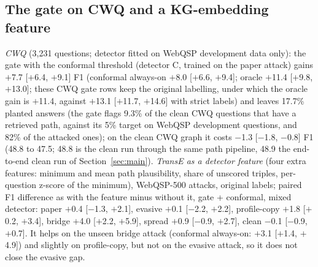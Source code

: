 \documentclass[preprint,12pt]{elsarticle}
\begin{document}
\subsection{The gate on CWQ and a KG-embedding feature}\label{sec:cwqkge}
\emph{CWQ} (3{,}231 questions; detector fitted on WebQSP development data only): the gate with the conformal threshold (detector C, trained on the paper attack) gains $+$7.7 [$+$6.4, $+$9.1] F1 (conformal always-on $+$8.0 [$+$6.6, $+$9.4]; oracle $+$11.4 [$+$9.8, $+$13.0]; these CWQ gate rows keep the original labelling, under which the oracle gain is $+$11.4, against $+$13.1 [$+$11.7, $+$14.6] with strict labels) and leaves 17.7\% planted answers (the gate flags 9.3\% of the clean CWQ questions that have a retrieved path, against its 5\% target on WebQSP development questions, and 82\% of the attacked ones); on the clean CWQ graph it costs $-$1.3 [$-$1.8, $-$0.8] F1 (48.8 to 47.5; 48.8 is the clean run through the same path pipeline, 48.9 the end-to-end clean run of Section~\ref{sec:main}). \emph{TransE as a detector feature} (four extra features: minimum and mean path plausibility, share of unscored triples, per-question z-score of the minimum), WebQSP-500 attacks, original labels; paired F1 difference as with the feature minus without it, gate + conformal, mixed detector: paper $+$0.4 [$-$1.3, $+$2.1], evasive $+$0.1 [$-$2.2, $+$2.2], profile-copy $+$1.8 [$+$0.2, $+$3.4], bridge $+$4.0 [$+$2.2, $+$5.9], spread $+$0.9 [$-$0.9, $+$2.7], clean $-$0.1 [$-$0.9, $+$0.7]. It helps on the unseen bridge attack (conformal always-on: $+$3.1 [$+$1.4, $+$4.9]) and slightly on profile-copy, but not on the evasive attack, so it does not close the evasive gap.
\end{document}
